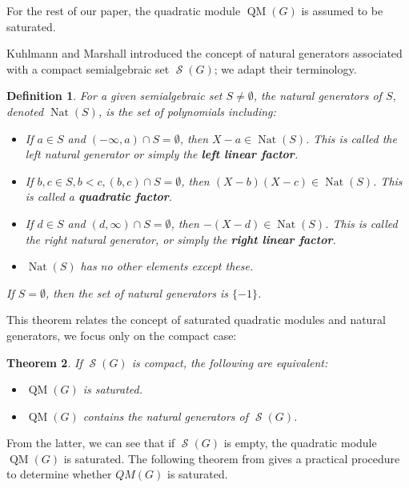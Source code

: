 \documentclass[preprint,12pt,authoryear]{elsarticle}
\newtheorem{theorem}{Theorem}[section]
\newtheorem{definition}[theorem]{Definition}
\DeclareMathOperator{\quadmod}{QM}
\DeclareMathOperator{\semialgebraic}{\mathcal{S}}
\DeclareMathOperator{\Nat}{Nat}
\DeclareMathOperator{\QM}{QM}
\begin{document}
For the rest of our paper, the quadratic module $\QM(G)$ is assumed to
be saturated.

Kuhlmann and Marshall introduced the concept of natural generators associated
with a compact semialgebraic set $\semialgebraic(G)$; we adapt their
terminology.

\begin{definition}\cite{marshall2002}
  \th\label{sec:preliminaries} For a given semialgebraic set $S \neq \emptyset$,
  the natural generators of $S$, denoted $\Nat(S)$, is the set of polynomials
  including:
  \begin{itemize}
  \item[(i)] If $a \in S$ and $(-\infty, a) \cap S = \emptyset$, then
    $X - a \in \Nat(S)$. This is called the left natural generator or simply the
    {\bf left linear factor}.
  \item[(ii)] If $b, c \in S, b < c, (b, c) \cap S = \emptyset$, then
    $(X - b)(X - c) \in \Nat(S)$.  This is called a {\bf quadratic
      factor}.
  \item[(iii)] If $d \in S$ and $(d, \infty) \cap S = \emptyset$, then
    $-(X - d) \in \Nat(S)$. This is called the right natural generator, or simply
    the {\bf right linear factor}.
 
  \item[(iv)] $\Nat(S)$ has no other elements except these.
  \end{itemize}

  If $S = \emptyset$, then the set of natural generators is $\{-1\}$.
\end{definition}

This theorem relates the concept of saturated quadratic modules and natural
generators, we focus only on the compact case:

\begin{theorem}\cite[][Theorem 3.1, item (b)]{marshall2005}
  \th\label{sec:natur-gener-assoc}
  If $\semialgebraic(G)$ is compact, the following are equivalent:
  \begin{itemize}
  \item $\quadmod(G)$ is saturated.
  \item $\quadmod(G)$ contains the natural generators of $\semialgebraic(G)$.
  \end{itemize}
\end{theorem}

From the latter, we can see that if $\semialgebraic(G)$ is empty, the quadratic
module $\quadmod(G)$ is saturated. The following theorem from
\cite{marshall2005} gives a practical procedure to determine whether $QM(G)$ is
saturated.
\end{document}
